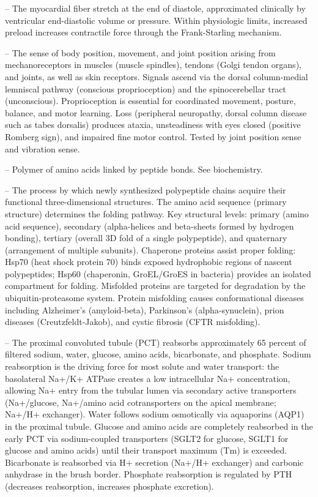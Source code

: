 -- The myocardial fiber stretch at the end of diastole, approximated clinically by ventricular end-diastolic volume or pressure. Within physiologic limits, increased preload increases contractile force through the Frank-Starling mechanism.

-- The sense of body position, movement, and joint position arising from mechanoreceptors in muscles (muscle spindles), tendons (Golgi tendon organs), and joints, as well as skin receptors. Signals ascend via the dorsal column-medial lemniscal pathway (conscious proprioception) and the spinocerebellar tract (unconscious). Proprioception is essential for coordinated movement, posture, balance, and motor learning. Loss (peripheral neuropathy, dorsal column disease such as tabes dorsalis) produces ataxia, unsteadiness with eyes closed (positive Romberg sign), and impaired fine motor control. Tested by joint position sense and vibration sense.

-- Polymer of amino acids linked by peptide bonds. See biochemistry.

-- The process by which newly synthesized polypeptide chains acquire their functional three-dimensional structures. The amino acid sequence (primary structure) determines the folding pathway. Key structural levels: primary (amino acid sequence), secondary (alpha-helices and beta-sheets formed by hydrogen bonding), tertiary (overall 3D fold of a single polypeptide), and quaternary (arrangement of multiple subunits). Chaperone proteins assist proper folding: Hsp70 (heat shock protein 70) binds exposed hydrophobic regions of nascent polypeptides; Hsp60 (chaperonin, GroEL/GroES in bacteria) provides an isolated compartment for folding. Misfolded proteins are targeted for degradation by the ubiquitin-proteasome system. Protein misfolding causes conformational diseases including Alzheimer's (amyloid-beta), Parkinson's (alpha-synuclein), prion diseases (Creutzfeldt-Jakob), and cystic fibrosis (CFTR misfolding).

-- The proximal convoluted tubule (PCT) reabsorbs approximately 65 percent of filtered sodium, water, glucose, amino acids, bicarbonate, and phosphate. Sodium reabsorption is the driving force for most solute and water transport: the basolateral Na+/K+ ATPase creates a low intracellular Na+ concentration, allowing Na+ entry from the tubular lumen via secondary active transporters (Na+/glucose, Na+/amino acid cotransporters on the apical membrane; Na+/H+ exchanger). Water follows sodium osmotically via aquaporins (AQP1) in the proximal tubule. Glucose and amino acids are completely reabsorbed in the early PCT via sodium-coupled transporters (SGLT2 for glucose, SGLT1 for glucose and amino acids) until their transport maximum (Tm) is exceeded. Bicarbonate is reabsorbed via H+ secretion (Na+/H+ exchanger) and carbonic anhydrase in the brush border. Phosphate reabsorption is regulated by PTH (decreases reabsorption, increases phosphate excretion).

